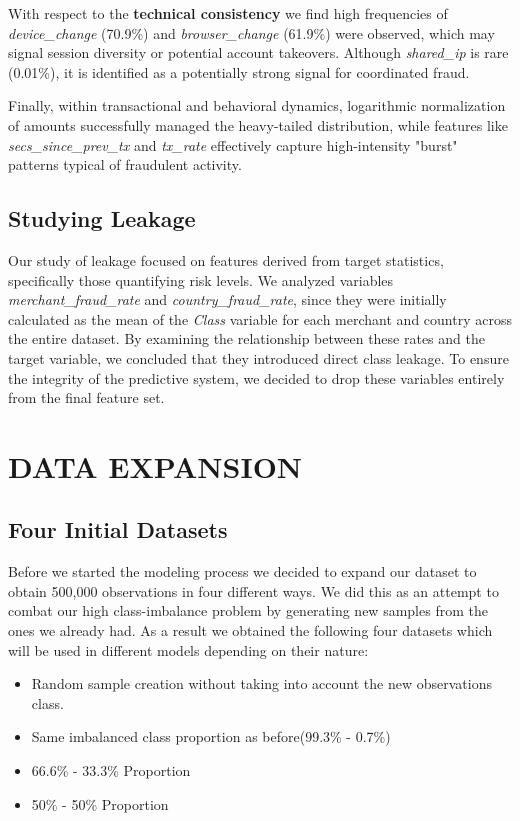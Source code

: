 \documentclass[12pt,a4paper]{report}
\begin{document}
With respect to the \textbf{technical consistency} we find high frequencies of \textit{device\_change} (70.9\%) and \textit{browser\_change} (61.9\%) were observed, which may signal session diversity or potential account takeovers. Although \textit{shared\_ip} is rare (0.01\%), it is identified as a potentially strong signal for coordinated fraud.

Finally, within transactional and behavioral dynamics, logarithmic normalization of amounts successfully managed the heavy-tailed distribution, while features like \textit{secs\_since\_prev\_tx} and \textit{tx\_rate} effectively capture high-intensity "burst" patterns typical of fraudulent activity.

\section{Studying Leakage}
Our study of leakage focused on features derived from target statistics, specifically those quantifying risk levels. We analyzed variables \textit{merchant\_fraud\_rate} and \textit{country\_fraud\_rate}, since they were initially calculated as the mean of the \textit{Class} variable for each merchant and country across the entire dataset. By examining the relationship between these rates and the target variable, we concluded that they introduced direct class leakage. To ensure the integrity of the predictive system, we decided to drop these variables entirely from the final feature set. 

\chapter{DATA EXPANSION}
\section{Four Initial Datasets}
Before we started the modeling process we decided to expand our dataset to obtain 500,000 observations in four different ways. We did this as an attempt to combat our high class-imbalance problem by generating new samples from the ones we already had. As a result we obtained the following four datasets which will be used in different models depending on their nature:

\begin{itemize}
    \item Random sample creation without taking into account the new observations class.
    \item Same imbalanced class proportion as before(99.3\% - 0.7\%)
    \item 66.6\% - 33.3\% Proportion
    \item 50\% - 50\% Proportion
\end{itemize}
\end{document}
